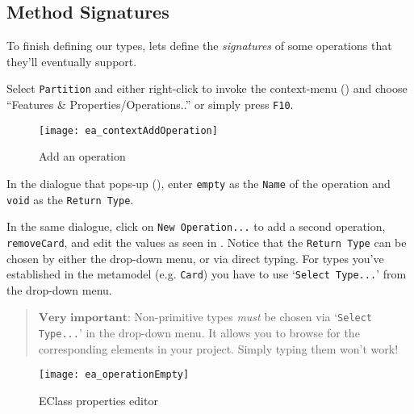 \newpage
\subsection{Method Signatures}
\genHeader
\hypertarget{static:methods vis}{}

To finish defining our types, lets define the \emph{signatures} of some operations that they'll eventually support.

\begin{stepbystep}

\item  Select \texttt{Partition} and either right-click to invoke the context-menu ()  and choose ``Features \&
Properties/Operations..'' or simply press \texttt{F10}.

\begin{figure}[htbp]
	\centering
  \texttt{[image: ea\_contextAddOperation]}
	\caption{Add an operation}
	\label{ea:add_operation}
\end{figure}
\FloatBarrier

\item  In the dialogue that pops-up (), enter \texttt{empty} as the \texttt{Name} of the operation and \texttt{void} as the \texttt{Return Type}.

\vspace{0.5cm}

\item  In the same dialogue, click on \texttt{New Operation...} to add a second operation, \texttt{removeCard}, and edit the values as seen in 
. Notice that the \texttt{Return Type} can be chosen by either the drop-down menu, or via direct typing. For types you've established in
the metamodel (e.g. \texttt{Card}) you have to use `\texttt{Select Type...}' from the drop-down menu.
\vspace{-.3cm}
\begin{quote}
{ \small
$\textbf{Very important:}$ Non-primitive types \emph{must} be chosen via `\texttt{Select Type...}' in the drop-down menu. It allows you to browse for the corresponding elements in
your project. Simply typing them won't work!
}
\end{quote}

\begin{figure}[htbp]
	\centering
  	\texttt{[image: ea\_operationEmpty]}
	\caption{EClass properties editor}
	\label{ea:operation_properties}
\end{figure}



\end{stepbystep}
